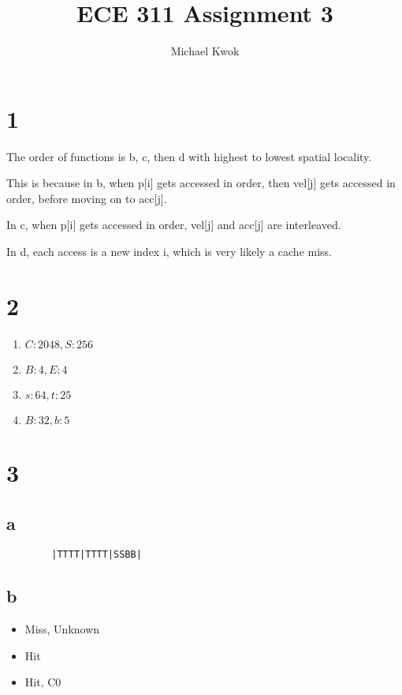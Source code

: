 \documentclass{article}
\title{ECE 311 Assignment 3}
\author{Michael Kwok}
\begin{document}
\maketitle
\begin{multicols}{2}
    \section*{1}
    The order of functions is b, c, then d with highest to lowest spatial locality.

    This is because in b, when p[i] gets accessed in order, then vel[j] gets accessed in order, before moving on to acc[j].

    In c, when p[i] gets accessed in order, vel[j] and acc[j] are interleaved.

    In d, each access is a new index i, which is very likely a cache miss.

    \section*{2}
    \begin{enumerate}
        \item \(C: 2048, S: 256\)
        \item \(B: 4, E: 4\)
        \item \(s: 64, t: 25\)
        \item \(B: 32, b: 5\)
    \end{enumerate}

    \section*{3}
    \subsection*{a}
    \begin{verbatim}
        |TTTT|TTTT|SSBB|
    \end{verbatim}
    \subsection*{b}
    \begin{itemize}
        \item Miss, Unknown
        \item Hit
        \item Hit, C0
    \end{itemize}


\end{multicols}
\end{document}
